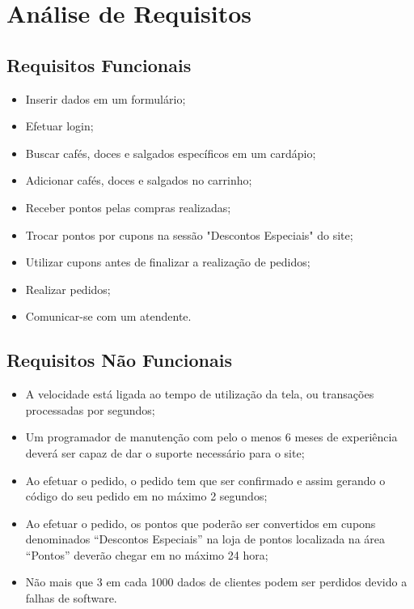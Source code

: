 
\chapter{Análise de Requisitos}

\section{Requisitos Funcionais}
\begin{itemize}
	\item Inserir dados em um formulário;
	\item Efetuar login;
	\item Buscar cafés, doces e salgados específicos em um cardápio;
	\item Adicionar cafés, doces e salgados no carrinho;
	\item Receber pontos pelas compras realizadas;
	\item Trocar pontos por cupons na sessão "Descontos Especiais" do site;
	\item Utilizar cupons antes de finalizar a realização de pedidos;
	\item Realizar pedidos;
	\item Comunicar-se com um atendente.
\end{itemize}

\section{Requisitos Não Funcionais}
\begin{itemize}
	\item A velocidade está ligada ao tempo de utilização da tela, ou transações
	processadas por segundos;
	\item Um programador de manutenção com pelo o menos 6 meses de
	experiência deverá ser capaz de dar o suporte necessário para o site;
	\item Ao efetuar o pedido, o pedido tem que ser confirmado e assim gerando
	o código do seu pedido em no máximo 2 segundos;
	\item Ao efetuar o pedido, os pontos que poderão ser convertidos em cupons denominados
	“Descontos Especiais” na loja de pontos localizada na área “Pontos” deverão chegar em no máximo 24 hora;
	\item Não mais que 3 em cada 1000 dados de clientes podem ser perdidos
	devido a falhas de software.
\end{itemize}

